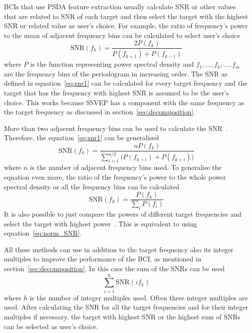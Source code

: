 \glspl{BCI} that use \gls{PSDA} \gls{feature extraction} usually calculate \gls{SNR} or other values that are related to \gls{SNR} of each \gls{target} and then select the \gls{target} with the highest \gls{SNR} or related value as user's choice. For example, the ratio of frequency's power to the \gls{mean} of adjacent \glspl{frequency bin} can be calculated to select user's choice~\cite{psda_snr1}
\begin{equation}
	\label{eq:snr1}
	\mbox{SNR}(f_k) = \frac{2P(f_k)}{P(f_{k+1})+P(f_{k-1})}
\end{equation}
where $P$ is the function representing \gls{power spectral density} and $f_1,\dots, f_k,\dots,f_m$ are the \glspl{frequency bin} of the \gls{periodogram} in increasing order. The \gls{SNR} as defined in equation~\ref{eq:snr1} can be calculated for every \gls{target} frequency and the \gls{target} that has the frequency with highest \gls{SNR} is assumed to be the user's choice. This works because \gls{SSVEP} has a component with the same frequency as the \gls{target} frequency as discussed in section~\ref{sec:decomposition}.

More than two adjacent \glspl{frequency bin} can be used to calculate the \gls{SNR}~\cite{psda_snr2}. Therefore, the equation~\ref{eq:snr1} can be generalised
\begin{equation}
	\mbox{SNR}(f_k) = \frac{nP(f_k)}{\sum_{i=1}^{n/2}\big(P(f_{k-i})+P(f_{k+i})\big)}
\end{equation}
where $n$ is the number of adjacent \glspl{frequency bin} used. To generalise the equation even more, the ratio of the frequency's power to the whole \gls{power spectral density} or all the \glspl{frequency bin} can be calculated
\begin{equation}
	\label{eq:norm_SNR}
	\mbox{SNR}(f_k) = \frac{P(f_k)}{\sum_i P(f_i)}
\end{equation}
It is also possible to just compare the powers of different \gls{target} frequencies and select the \gls{target} with highest power~\cite{cca_psda}. This is equivalent to using equation~\ref{eq:norm_SNR}.

All these methods can use in addition to the \gls{target} frequency also its integer multiples to improve the performance of the \gls{BCI}, as mentioned in section~\ref{sec:decomposition}. In this case the sum of the \glspl{SNR} can be used
\begin{equation}
	\sum_{i=1}^{h}\mbox{SNR}(if_k)
\end{equation}
where $h$ is the number of integer multiples used. Often three integer multiples are used. After calculating the \gls{SNR} for all the \gls{target} frequencies and for their integer multiples if necessary, the \gls{target} with highest \gls{SNR} or the highest sum of \glspl{SNR} can be selected as user's choice.

